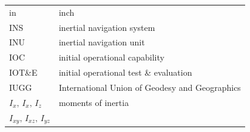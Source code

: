 \documentclass[
]{book}
\begin{document}
\begin{longtable}[]{@{}ll@{}}
\begin{minipage}[t]{0.47\columnwidth}
in\strut
\end{minipage} & \begin{minipage}[t]{0.47\columnwidth}\raggedright
inch\strut
\end{minipage}\tabularnewline
\begin{minipage}[t]{0.47\columnwidth}\raggedright
INS\strut
\end{minipage} & \begin{minipage}[t]{0.47\columnwidth}\raggedright
inertial navigation system\strut
\end{minipage}\tabularnewline
\begin{minipage}[t]{0.47\columnwidth}\raggedright
INU\strut
\end{minipage} & \begin{minipage}[t]{0.47\columnwidth}\raggedright
inertial navigation unit\strut
\end{minipage}\tabularnewline
\begin{minipage}[t]{0.47\columnwidth}\raggedright
IOC\strut
\end{minipage} & \begin{minipage}[t]{0.47\columnwidth}\raggedright
initial operational capability\strut
\end{minipage}\tabularnewline
\begin{minipage}[t]{0.47\columnwidth}\raggedright
IOT\&E\strut
\end{minipage} & \begin{minipage}[t]{0.47\columnwidth}\raggedright
initial operational test \& evaluation\strut
\end{minipage}\tabularnewline
\begin{minipage}[t]{0.47\columnwidth}\raggedright
IUGG\strut
\end{minipage} & \begin{minipage}[t]{0.47\columnwidth}\raggedright
International Union of Geodesy and Geographics\strut
\end{minipage}\tabularnewline
\begin{minipage}[t]{0.47\columnwidth}\raggedright
\(I_x \text{, } I_x\text{, } I_z\)\strut
\end{minipage} & \begin{minipage}[t]{0.47\columnwidth}\raggedright
moments of inertia\strut
\end{minipage}\tabularnewline
\begin{minipage}[t]{0.47\columnwidth}\raggedright
\(I_{xy}\text{, }I_{xz}\text{, } I_{yz}\)\strut
\end{minipage} & \begin{minipage}[t]{0.47\columnwidth}\raggedright

\end{minipage}
\end{longtable}
\end{document}
